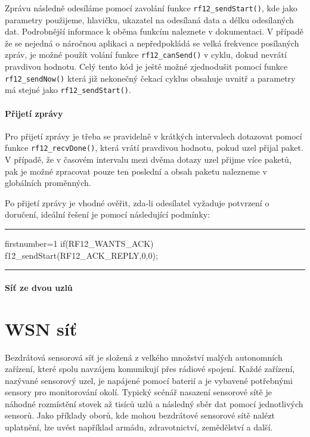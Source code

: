 \documentclass[12pt,titlepage]{article}
\newcommand{\codetitle}[1]{\bigskip \noindent {\scriptsize #1}\hrule}
\begin{document}
		Zprávu následně odesíláme pomocí zavolání funkce \texttt{rf12\_sendStart()}, kde jako parametry použijeme, hlavičku, ukazatel na odesílaná data a délku odesílaných dat. Podrobnější informace k oběma funkcím naleznete v dokumentaci. V případě že se nejedná o náročnou aplikaci a nepředpokládá se velká frekvence posílaných zpráv, je možné použít volání funkce \texttt{rf12\_canSend()} v cyklu, dokud nevrátí pravdivou hodnotu. Celý tento kód je ještě možné zjednodušit pomocí funkce \texttt{rf12\_sendNow()} která již nekonečný čekací cyklus obsahuje uvnitř a parametry má stejné jako \texttt{rf12\_sendStart()}. 
		
		\paragraph{Přijetí zprávy}
		Pro přijetí zprávy je třeba se pravidelně v krátkých intervalech dotazovat pomocí funkce \texttt{rf12\_recvDone()}, která vrátí pravdivou hodnotu, pokud uzel přijal paket. V případě, že v časovém intervalu mezi dvěma dotazy uzel přijme více paketů, pak je možné zpracovat pouze ten poslední a obsah paketu nalezneme v globálních proměnných. 
		
		Po přijetí zprávy  je vhodné ověřit, zda-li odesílatel vyžaduje potvrzení o doručení, ideální řešení je pomocí následující podmínky:

		
\codetitle{Ukázka podmínky pro odeslání ACK zprávy}
\begin{cppcode*}{firstnumber=1}		
if(RF12_WANTS_ACK){
    f12_sendStart(RF12_ACK_REPLY,0,0);
}
\end{cppcode*}		
\hrule
\bigskip
	
		\paragraph{Síť ze dvou uzlů}
	
\section{WSN síť}

	Bezdrátová sensorová síť je složená z velkého množství malých autonomních zařízení, které spolu navzájem komunikují přes rádiové spojení. Každé zařízení, nazývané sensorový uzel, je napájené pomocí 	baterií a je vybavené potřebnými sensory pro monitorování okolí. Typický scénář nasazení sensorové sítě je náhodné rozmístění stovek až tisíců uzlů a následný sběr dat pomocí jednotlivých sensorů. Jako příklady oborů, kde mohou bezdrátové sensorové sítě nalézt uplatnění, lze uvést například armádu, zdravotnictví, zemědělství a další.
	
\end{document}
